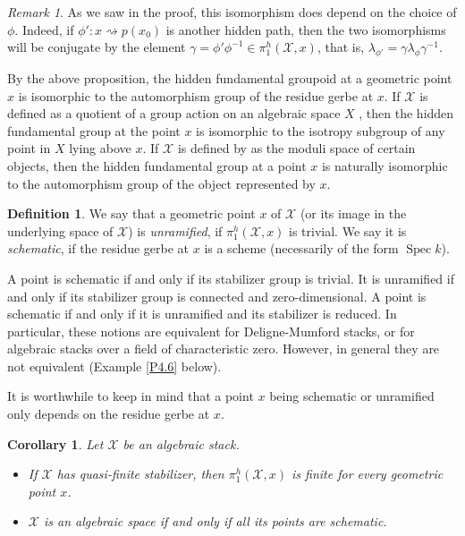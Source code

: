 \documentclass{amsart}
\newtheorem{cor}[thm]{Corollary}
\theoremstyle{definition}
\newtheorem{defn}[thm]{Definition}
\theoremstyle{remark}
\newtheorem{rem}[thm]{Remark}
\theoremstyle{remark}
\newcommand{\X}{\mathcal{X}}
\newcommand{\rsa}{\rightsquigarrow}
\newcommand{\phX}{\pi_1^{h}(\X,x)}
\let\:=\colon
\newcommand{\Spec}{\operatorname{Spec}}
\begin{document}
\begin{rem}
As we saw in the proof, this isomorphism does depend on the choice
of $\phi$. Indeed, if $\phi' \: x \rsa p(x_0)$ is another hidden
path, then the two isomorphisms will be conjugate by the element
$\gamma=\phi' \phi^{-1} \in \phX$, that is, $\lambda_{\phi'}
=\gamma \lambda_{\phi} \gamma^{-1}$.
\end{rem}

By the above proposition, the hidden fundamental groupoid at a
geometric point $x$ is isomorphic to the automorphism group of the
residue gerbe at $x$. If $\X$ is defined as a quotient of a group
action on an algebraic space $X$ , then the hidden fundamental
group at  the point $x$ is isomorphic to the isotropy subgroup of
any point in $X$ lying above $x$. If $\X$ is defined by as the
moduli space of certain objects, then the hidden fundamental group
at a point $x$ is naturally isomorphic to the automorphism group
of the object represented by $x$.

\begin{defn}
We say that a geometric point $x$ of $\X$  (or its image in the
underlying space of $\X$) is {\sl unramified}, if $\phX$ is
trivial. We say it is {\sl schematic}, if the residue gerbe at $x$
is a scheme (necessarily of the form $\Spec k$).
\end{defn}

A point is schematic if and only if its stabilizer group is
trivial. It is unramified if and only if its stabilizer group is
connected and zero-dimensional. A point is schematic if and only
if it is unramified and its stabilizer is reduced. In particular,
these notions are equivalent for Deligne-Mumford stacks, or for
algebraic stacks over a field of characteristic zero. However, in
general they are not equivalent (Example \ref{P4.6} below).

It is worthwhile to keep in mind that a point $x$ being schematic
or unramified only depends on the residue gerbe at $x$.



\begin{cor}{\label{P4.5}}
Let $\X$ be an algebraic stack.
\begin{itemize}
\item[$\mathbf {i})$] If $\X$ has quasi-finite stabilizer,
then $\phX$ is finite for every geometric point $x$.

\item[$\mathbf {ii})$] $\X$ is an algebraic space if and only if
all its points are schematic.
\end{itemize}
\end{cor}
\end{document}
